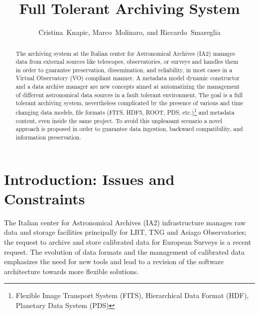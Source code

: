 
\resetcounters



\title{Full Tolerant Archiving System}
\author{Cristina~Knapic, Marco~Molinaro, and Riccardo~Smareglia
}


\begin{abstract}
The archiving system at the Italian center for Astronomical Archives (IA2) manages
data from external sources like telescopes, observatories, or surveys and handles
them in order to guarantee preservation, dissemination, and reliability, in most
cases in a Virtual Observatory (VO) compliant manner. A metadata model dynamic
constructor and a data archive manager are new concepts aimed at automatizing the
management of different astronomical data sources in a fault tolerant environment.
The goal is a full tolerant archiving system, nevertheless complicated by the presence
of various and time changing data models, file formats (FITS, HDF5, ROOT, PDS, etc.)\footnote{Flexible Image Transport System (FITS), Hierarchical Data Format (HDF), Planetary Data System (PDS)} and metadata content, even inside the same project. To avoid this
unpleasant scenario a novel approach is proposed in order to guarantee data ingestion,
backward compatibility, and information preservation.
\end{abstract}

\section{Introduction: Issues and Constraints}
The Italian center for Astronomical Archives (IA2) infrastructure manages raw data and storage facilities principally
for LBT, TNG and Asiago Observatories; the request to archive and store
calibrated data for European Surveys is a recent request. The evolution of
data formats and the management of calibrated data emphasizes the need for
new tools and lead to a revision of the software architecture towards more
flexible solutions.

